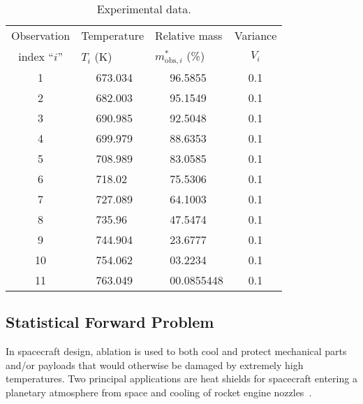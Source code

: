 \begin{table}[htb]
\begin{center}
\begin{tabular}{cllc}
\toprule
Observation   & Temperature     & Relative mass             & Variance \\
index ``$i$'' & $T_i$ (K)       & $m^*_{\text{obs},i}$ (\%) & $V_i$    \\
\midrule
\midrule
 1            & $\quad$ 673.034 & $\quad$ 96.5855    & 0.1      \\
 2            & $\quad$ 682.003 & $\quad$ 95.1549    & 0.1      \\
 3            & $\quad$ 690.985 & $\quad$ 92.5048    & 0.1      \\
 4            & $\quad$ 699.979 & $\quad$ 88.6353    & 0.1      \\
 5            & $\quad$ 708.989 & $\quad$ 83.0585    & 0.1      \\
 6            & $\quad$ 718.02  & $\quad$ 75.5306    & 0.1      \\
 7            & $\quad$ 727.089 & $\quad$ 64.1003    & 0.1      \\
 8            & $\quad$ 735.96  & $\quad$ 47.5474    & 0.1      \\
 9            & $\quad$ 744.904 & $\quad$ 23.6777    & 0.1      \\
 10           & $\quad$ 754.062 & $\quad$ 03.2234    & 0.1      \\
 11           & $\quad$ 763.049 & $\quad$ 00.0855448 & 0.1      \\
\bottomrule
\end{tabular}
\vspace{-.2cm}
\caption{Experimental data.}\label{table:data-tga}
\end{center}
\end{table}

\subsection{Statistical Forward Problem}\label{sec:tga-sfp}

In spacecraft design, ablation is used to both cool and protect mechanical parts and/or payloads that would otherwise be damaged by extremely high temperatures. Two principal applications are heat shields for spacecraft entering a planetary atmosphere from space and cooling of rocket engine nozzles~\cite{wiki:ablation}. 


